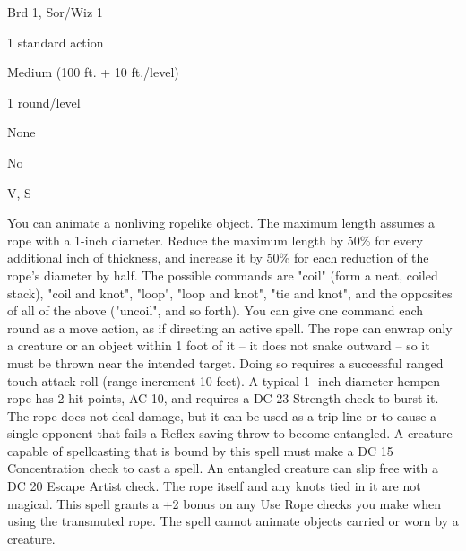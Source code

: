 
\begin{description*}
\item[Level:] Brd 1, Sor/Wiz 1
\item[Casting Time:] 1 standard action
\item[Range:] Medium (100 ft. + 10 ft./level)
\item[Duration:] 1 round/level
\item[Saving Throw:] None
\item[Spell Resistance:] No
\item[Components:] V, S
\end{description*}

You can animate a nonliving ropelike object. The maximum length assumes a rope
with a 1-inch diameter.
Reduce the maximum length by 50\% for every additional inch of thickness, and increase
it by 50\% for each reduction of the rope's diameter by half.
The possible commands are "coil" (form a neat, coiled stack), "coil and knot",
"loop", "loop and knot", "tie and knot", and the opposites of all of the
above ("uncoil", and so forth). You can give one command each round as a move
action, as if directing an active spell.
The rope can enwrap only a creature or an object within 1 foot of it -- it does
not snake outward -- so it must be thrown near the intended target. Doing so requires
a successful ranged touch attack roll (range increment 10 feet). A typical 1- inch-diameter
hempen rope has 2 hit points, AC 10, and requires a DC 23 Strength check to burst
it. The rope does not deal damage, but it can be used as a trip line or to cause
a single opponent that fails a Reflex saving throw to become entangled. A creature
capable of spellcasting that is bound by this spell must make a DC 15 Concentration
check to cast a spell. An entangled creature can slip free with a DC 20 Escape
Artist check.
The rope itself and any knots tied in it are not magical.
This spell grants a +2 bonus on any Use Rope checks you make when using the transmuted
rope.
The spell cannot animate objects carried or worn by a creature.
